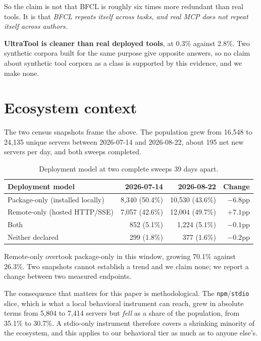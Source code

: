 \documentclass[11pt]{article}
\begin{document}
So the claim is not that BFCL is roughly six times more redundant than real
tools. It is that \emph{BFCL repeats itself across tasks, and real MCP does not
repeat itself across authors.}

\textbf{UltraTool is cleaner than real deployed tools}, at 0.3\% against 2.8\%.
Two synthetic corpora built for the same purpose give opposite answers, so no
claim about synthetic tool corpora as a class is supported by this evidence, and
we make none.

\section{Ecosystem context}
\label{sec:context}

The two census snapshots frame the above. The population grew from 16{,}548 to
24{,}135 unique servers between 2026-07-14 and 2026-08-22, about 195 net new
servers per day, and both sweeps completed.

\begin{table}[h]
\centering
\begin{tabular}{lrrr}
\toprule
Deployment model & 2026-07-14 & 2026-08-22 & Change \\
\midrule
Package-only (installed locally) & 8{,}340 (50.4\%)  & 10{,}530 (43.6\%) & $-6.8$pp \\
Remote-only (hosted HTTP/SSE)    & 7{,}057 (42.6\%)  & 12{,}004 (49.7\%) & $+7.1$pp \\
Both                             & 852 (5.1\%)     & 1{,}224 (5.1\%)   & $-0.1$pp \\
Neither declared                 & 299 (1.8\%)     & 377 (1.6\%)     & $-0.2$pp \\
\bottomrule
\end{tabular}
\caption{Deployment model at two complete sweeps 39 days apart.}
\label{tab:deploy}
\end{table}

Remote-only overtook package-only in this window, growing 70.1\% against 26.3\%.
Two snapshots cannot establish a trend and we claim none; we report a change
between two measured endpoints.

The consequence that matters for this paper is methodological. The
\texttt{npm}/\texttt{stdio} slice, which is what a local behavioral instrument can
reach, grew in absolute terms from 5{,}804 to 7{,}414 servers but \emph{fell} as a
share of the population, from 35.1\% to 30.7\%. A stdio-only instrument therefore
covers a shrinking minority of the ecosystem, and this applies to our behavioral
tier as much as to anyone else's.
\end{document}
